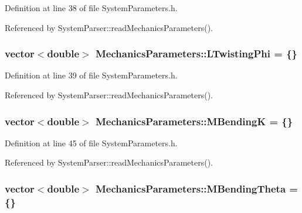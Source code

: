 Definition at line 38 of file System\+Parameters.\+h.



Referenced by System\+Parser\+::read\+Mechanics\+Parameters().

\hypertarget{structMechanicsParameters_a8cc146be39259d4b1edd94b70d9b1832}{
\subsubsection[{L\+Twisting\+Phi}]{\setlength{\rightskip}{0pt plus 5cm}vector$<$double$>$ Mechanics\+Parameters\+::\+L\+Twisting\+Phi = \{\}}}\label{structMechanicsParameters_a8cc146be39259d4b1edd94b70d9b1832}


Definition at line 39 of file System\+Parameters.\+h.



Referenced by System\+Parser\+::read\+Mechanics\+Parameters().

\hypertarget{structMechanicsParameters_abbc374692e6df3c7532e085918a98c4c}{
\subsubsection[{M\+Bending\+K}]{\setlength{\rightskip}{0pt plus 5cm}vector$<$double$>$ Mechanics\+Parameters\+::\+M\+Bending\+K = \{\}}}\label{structMechanicsParameters_abbc374692e6df3c7532e085918a98c4c}


Definition at line 45 of file System\+Parameters.\+h.



Referenced by System\+Parser\+::read\+Mechanics\+Parameters().

\hypertarget{structMechanicsParameters_a597e2027d01d684f5dfe90d8a2734a90}{
\subsubsection[{M\+Bending\+Theta}]{\setlength{\rightskip}{0pt plus 5cm}vector$<$double$>$ Mechanics\+Parameters\+::\+M\+Bending\+Theta = \{\}}}\label{structMechanicsParameters_a597e2027d01d684f5dfe90d8a2734a90}


